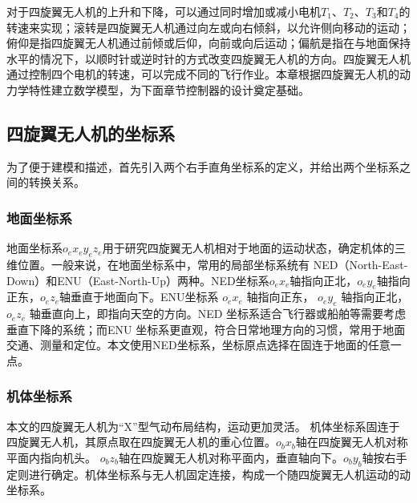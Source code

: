 \documentclass[lang=chs, degree=master, blindreview=false, winfonts=true]{yanputhesis}
\begin{document}
对于四旋翼无人机的上升和下降，可以通过同时增加或减小电机$T_1$、$T_2$、$T_3$和$T_4$的转速来实现；滚转是四旋翼无人机通过向左或向右倾斜，以允许侧向移动的运动；俯仰是指四旋翼无人机通过前倾或后仰，向前或向后运动；偏航是指在与地面保持水平的情况下，以顺时针或逆时针的方式改变四旋翼无人机的方向。四旋翼无人机通过控制四个电机的转速，可以完成不同的飞行作业。本章根据四旋翼无人机的动力学特性建立数学模型，为下面章节控制器的设计奠定基础。


\subsection{四旋翼无人机的坐标系}
为了便于建模和描述，首先引入两个右手直角坐标系的定义，并给出两个坐标系之间的转换关系。
\subsubsection{地面坐标系}
地面坐标系$o_ex_ey_ez_e$用于研究四旋翼无人机相对于地面的运动状态，确定机体的三维位置。一般来说，在地面坐标系中，常用的局部坐标系统有 NED（North-East-Down）和ENU（East-North-Up）两种。NED坐标系$o_ex_e$轴指向正北，$o_ey_e$轴指向正东，$o_ez_e$轴垂直于地面向下。ENU坐标系 $o_ex_e$ 轴指向正东，
$o_ey_e$ 轴指向正北，$o_ez_e$ 轴垂直向上，即指向天空的方向。NED 坐标系适合飞行器或船舶等需要考虑垂直下降的系统；而ENU 坐标系更直观，符合日常地理方向的习惯，常用于地面交通、测量和定位。本文使用NED坐标系，坐标原点选择在固连于地面的任意一点。

\subsubsection{机体坐标系}
本文的四旋翼无人机为“X”型气动布局结构，运动更加灵活。
机体坐标系固连于四旋翼无人机，其原点取在四旋翼无人机的重心位置。$o_bx_b$轴在四旋翼无人机对称平面内指向机头。 $o_bz_b$轴在四旋翼无人机对称平面内，垂直轴向下。$o_by_b$轴按右手定则进行确定。机体坐标系与无人机固定连接，构成一个随四旋翼无人机运动的动坐标系。
\end{document}

